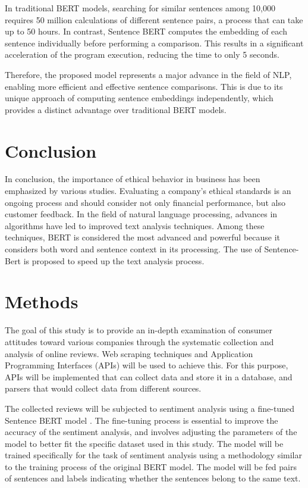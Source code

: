 \documentclass[PI]{ProjectProposal}
\begin{document}
In traditional BERT models, searching for similar sentences among 10,000 requires 50 million calculations of different sentence pairs, a process that can take up to 50 hours. In contrast, Sentence BERT computes the embedding of each sentence individually before performing a comparison. This results in a significant acceleration of the program execution, reducing the time to only 5 seconds.

Therefore, the proposed model represents a major advance in the field of NLP, enabling more efficient and effective sentence comparisons. This is due to its unique approach of computing sentence embeddings independently, which provides a distinct advantage over traditional BERT models.
\section{Conclusion}
\label{sec:orga375ae2}
In conclusion, the importance of ethical behavior in business has been emphasized by various studies. Evaluating a company's ethical standards is an ongoing process and should consider not only financial performance, but also customer feedback. In the field of natural language processing, advances in algorithms have led to improved text analysis techniques. Among these techniques, BERT is considered the most advanced and powerful because it considers both word and sentence context in its processing. The use of Sentence-Bert is proposed to speed up the text analysis process.
\section{Methods}
\label{sec:orgb985cc4}
The goal of this study is to provide an in-depth examination of consumer attitudes toward various companies through the systematic collection and analysis of online reviews. Web scraping techniques and Application Programming Interfaces (APIs) will be used to achieve this. For this purpose, APIs will be implemented that can collect data and store it in a database, and parsers that would collect data from different sources.

The collected reviews will be subjected to sentiment analysis using a fine-tuned Sentence BERT model \autocite{reimers-2019-sentence-bert}. The fine-tuning process is essential to improve the accuracy of the sentiment analysis, and involves adjusting the parameters of the model to better fit the specific dataset used in this study. The model will be trained specifically for the task of sentiment analysis using a methodology similar to the training process of the original BERT model. The model will be fed pairs of sentences and labels indicating whether the sentences belong to the same text.
\end{document}
